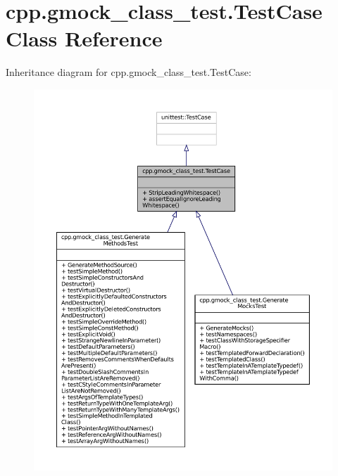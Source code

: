 \hypertarget{classcpp_1_1gmock__class__test_1_1TestCase}{}\section{cpp.\+gmock\+\_\+class\+\_\+test.\+Test\+Case Class Reference}
\label{classcpp_1_1gmock__class__test_1_1TestCase}


Inheritance diagram for cpp.\+gmock\+\_\+class\+\_\+test.\+Test\+Case\+:
\nopagebreak
\begin{figure}[H]
\begin{center}
\leavevmode
\includegraphics[width=350pt]{classcpp_1_1gmock__class__test_1_1TestCase__inherit__graph}
\end{center}
\end{figure}



